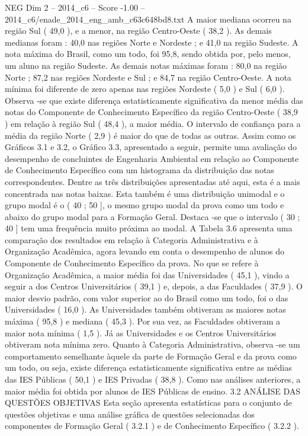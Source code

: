 \begin{textsample}{NEG Dim 2 – 2014\_c6 – Score -1.00 – 2014\_c6/enade\_2014\_eng\_amb\_c63c648bd8.txt}
A maior mediana ocorreu na região Sul ( 49,0 ), e a menor, na região Centro-Oeste ( 38,2 ).
As demais medianas foram : 40,0 nas regiões Norte e Nordeste ; e 41,0 na região Sudeste.
A nota máxima do Brasil, como um todo, foi 95,8, sendo obtida por, pelo menos, um aluno na região Sudeste.
As demais notas máximas foram : 80,0 na região Norte ; 87,2 nas regiões Nordeste e Sul ; e 84,7 na região Centro-Oeste.
A nota mínima foi diferente de zero apenas nas regiões Nordeste ( 5,0 ) e Sul ( 6,0 ).
Observa -se que existe diferença estatisticamente significativa da menor média das notas do Componente de Conhecimento Específico da região Centro-Oeste ( 38,9 ) em relação à região Sul ( 48,4 ), a maior média.
O intervalo de confiança para a média da região Norte ( 2,9 ) é maior do que de todas as outras.
Assim como os Gráficos 3.1 e 3.2, o Gráfico 3.3, apresentado a seguir, permite uma avaliação do desempenho de concluintes de Engenharia Ambiental em relação ao Componente de Conhecimento Específico com um histograma da distribuição das notas correspondentes.
Dentre as três distribuições apresentadas até aqui, esta é a mais concentrada nas notas baixas.
Esta também é uma distribuição unimodal e o grupo modal é o ( 40 ; 50 ], o mesmo grupo modal da prova como um todo e abaixo do grupo modal para a Formação Geral.
Destaca -se que o intervalo ( 30 ; 40 ] tem uma frequência muito próxima ao modal.
A Tabela 3.6 apresenta uma comparação dos resultados em relação à Categoria Administrativa e à Organização Acadêmica, agora levando em conta o desempenho de alunos do Componente de Conhecimento Específico da prova.
No que se refere à Organização Acadêmica, a maior média foi das Universidades ( 45,1 ), vindo a seguir a dos Centros Universitários ( 39,1 ) e, depois, a das Faculdades ( 37,9 ).
O maior desvio padrão, com valor superior ao do Brasil como um todo, foi o das Universidades ( 16,0 ).
As Universidades também obtiveram as maiores notas máxima ( 95,8 ) e mediana ( 45,3 ).
Por sua vez, as Faculdades obtiveram a maior nota mínima ( 1,5 ).
Já as Universidades e os Centros Universitários obtiveram nota mínima zero.
Quanto à Categoria Administrativa, observa -se um comportamento semelhante àquele da parte de Formação Geral e da prova como um todo, ou seja, existe diferença estatisticamente significativa entre as médias das IES Públicas ( 50,1 ) e IES Privadas ( 38,8 ).
Como nas análises anteriores, a maior média foi obtida por alunos de IES Públicas de ensino. 3.2 ANÁLISE DAS QUESTÕES OBJETIVAS Esta seção apresenta estatísticas para o conjunto de questões objetivas e uma análise gráfica de questões selecionadas dos componentes de Formação Geral ( 3.2.1 ) e de Conhecimento Específico ( 3.2.2 ).

\end{textsample}
